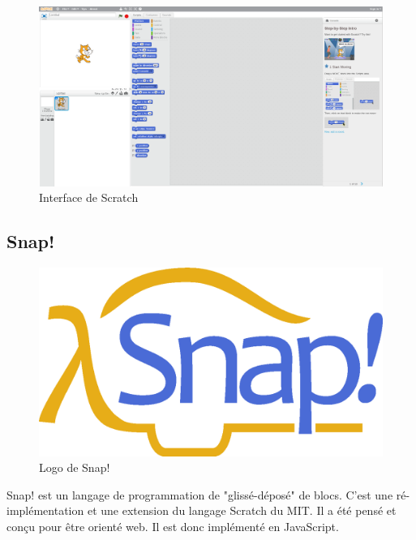 \begin{figure}
  \begin{center}
    \includegraphics[width=\textwidth]{content/5-related_work/images/scratch-printscreen}
    \caption{Interface de Scratch}
    \label{fig:scratch-printscreen}
  \end{center}
\end{figure}

\subsection{Snap!}

\begin{figure}[!ht]
  \begin{center}
    \includegraphics[scale=0.07]{content/5-related_work/images/snap}
    \caption{Logo de Snap!}
    \label{fig:snap}
  \end{center}
\end{figure}

Snap! \cite{snap} est un langage de programmation de "glissé-déposé" de blocs. C'est une ré-implémentation et une extension du langage Scratch du MIT. Il a été pensé et conçu pour être orienté web. Il est donc implémenté en JavaScript.\\

